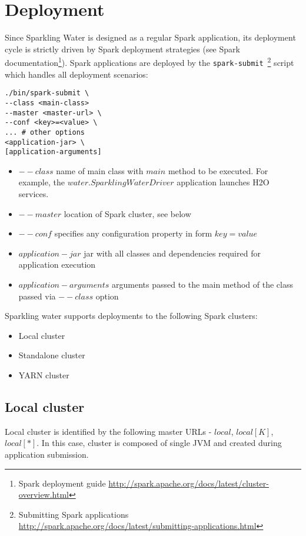 \section{Deployment}
Since Sparkling Water is designed as a regular Spark application, its deployment cycle is strictly driven by Spark deployment strategies (see Spark documentation\footnote{Spark deployment guide \url{http://spark.apache.org/docs/latest/cluster-overview.html}}). Spark applications are deployed by the \texttt{spark-submit}~\footnote{Submitting Spark applications \url{http://spark.apache.org/docs/latest/submitting-applications.html}} script which handles all deployment scenarios:

\begin{verbatim}
./bin/spark-submit \
--class <main-class>
--master <master-url> \
--conf <key>=<value> \
... # other options
<application-jar> \
[application-arguments]
\end{verbatim}

\begin{itemize}
	\item $--class$ name of main class with $main$ method to be executed. For example, the $water.SparklingWaterDriver$ application launches H2O services.
	\item $--master$ location of Spark cluster, see below
	\item $--conf$ specifies any configuration property in form $key=value$
	\item $application-jar$ jar with all classes and dependencies required for application execution
	\item $application-arguments$ arguments passed to the main method of the class passed via $--class$ option
\end{itemize}


Sparkling water supports deployments to the following Spark clusters:
\begin{itemize}
	\item{Local cluster}
	\item{Standalone cluster} 
	\item{YARN cluster}
\end{itemize}

\subsection{Local cluster}
Local cluster is identified by the following master URLs - $local$, $local[K]$, $local[*]$. In this case, cluster is composed of single JVM and created during application submission.

